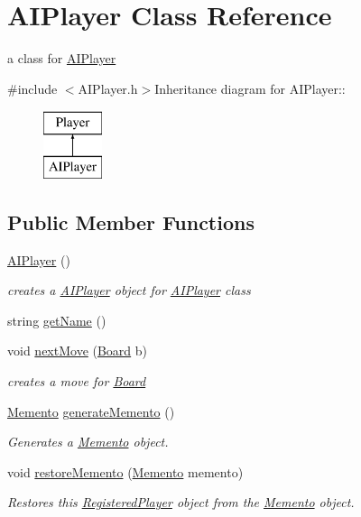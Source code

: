 \hypertarget{classAIPlayer}{
\section{AIPlayer Class Reference}
\label{classAIPlayer}
}


a class for \hyperlink{classAIPlayer}{AIPlayer}  


{\ttfamily \#include $<$AIPlayer.h$>$}Inheritance diagram for AIPlayer::\begin{figure}[H]
\begin{center}
\leavevmode
\includegraphics[height=2cm]{classAIPlayer}
\end{center}
\end{figure}
\subsection*{Public Member Functions}
\begin{DoxyCompactItemize}
\item 
\hyperlink{classAIPlayer_ae791562645a443fead734b4bdcb1509e}{AIPlayer} ()
\begin{DoxyCompactList}\small\item\em creates a \hyperlink{classAIPlayer}{AIPlayer} object for \hyperlink{classAIPlayer}{AIPlayer} class \item\end{DoxyCompactList}\item 
string \hyperlink{classAIPlayer_aaa733d49ac2e937a25d53a3b238fb3a8}{getName} ()
\item 
void \hyperlink{classAIPlayer_adb32c66ce4ba140188676aeea0317d36}{nextMove} (\hyperlink{classBoard}{Board} b)
\begin{DoxyCompactList}\small\item\em creates a move for \hyperlink{classBoard}{Board} \item\end{DoxyCompactList}\item 
\hyperlink{classMemento}{Memento} \hyperlink{classAIPlayer_a83d0865c5869bbf02a66207976842de6}{generateMemento} ()
\begin{DoxyCompactList}\small\item\em Generates a \hyperlink{classMemento}{Memento} object. \item\end{DoxyCompactList}\item 
void \hyperlink{classAIPlayer_a41aa8bd7a1d09ba00f1e6fa65083a248}{restoreMemento} (\hyperlink{classMemento}{Memento} memento)
\begin{DoxyCompactList}\small\item\em Restores this \hyperlink{classRegisteredPlayer}{RegisteredPlayer} object from the \hyperlink{classMemento}{Memento} object. \item\end{DoxyCompactList}\end{DoxyCompactItemize}


